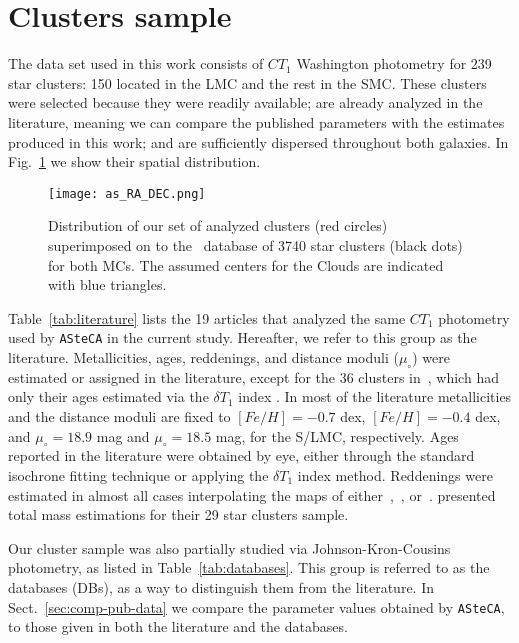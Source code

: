 \documentclass{aa}
\begin{document}

\section{Clusters sample}
\label{sec:clust-sample}

The data set used in this work consists of $CT_1$ Washington photometry for 239
star clusters: 150 located in the LMC and the rest in the SMC.\@
%
These clusters were selected because they were readily available; are
already analyzed in the literature, meaning we can compare the published
parameters with the estimates produced in this work; and are sufficiently
dispersed throughout both galaxies. In Fig.~\ref{fig:ra-dec} we show their
spatial distribution.

\begin{figure}
\centering
\texttt{[image: as\_RA\_DEC.png]}
\caption{Distribution of our set of analyzed clusters (red circles)
superimposed on to the~\cite{Bica_2008} database of 3740 star clusters (black
dots) for both MCs. The assumed centers for the Clouds are indicated with blue
triangles.}
\label{fig:ra-dec}
\end{figure}

Table~\ref{tab:literature} lists the 19 articles that analyzed the same
$CT_1$ photometry used by \texttt{ASteCA} in the current study. Hereafter, we
refer to this group as the literature.
%
Metallicities, ages, reddenings, and distance moduli ($\mu_{\circ}$)
were estimated or assigned in the literature, except for the 36
clusters in~\cite{Piatti_2011b}, which had only their ages estimated
via the $\delta T_1$ index \citep{Phelps_1994,Geisler_1997}.
%
In most of the literature metallicities and the distance moduli are fixed to
$[Fe/H]{=}-0.7$ dex, $[Fe/H]{=}-0.4$ dex, and $\mu_{\circ}{=}18.9$ mag and
$\mu_{\circ}{=}18.5$ mag, for the S/LMC, respectively.
Ages reported in the literature were obtained by eye, either through
the standard isochrone fitting technique or applying the $\delta T_1$ index
method.
Reddenings were estimated in almost all cases interpolating the maps
of either~\cite{Burstein_1982},~\cite{Schlegel_1998}, or~\cite{Haschke_2011}.
\cite{Maia_2013} presented total mass estimations for their 29 star clusters
sample.

Our cluster sample was also partially studied via Johnson-Kron-Cousins
photometry, as listed in Table~\ref{tab:databases}. This group is referred
to as the databases (DBs), as a way to distinguish them from the
literature. In Sect.~\ref{sec:comp-pub-data} we compare the parameter
values obtained by \texttt{ASteCA}, to those given in both the literature and
the databases.
\end{document}
